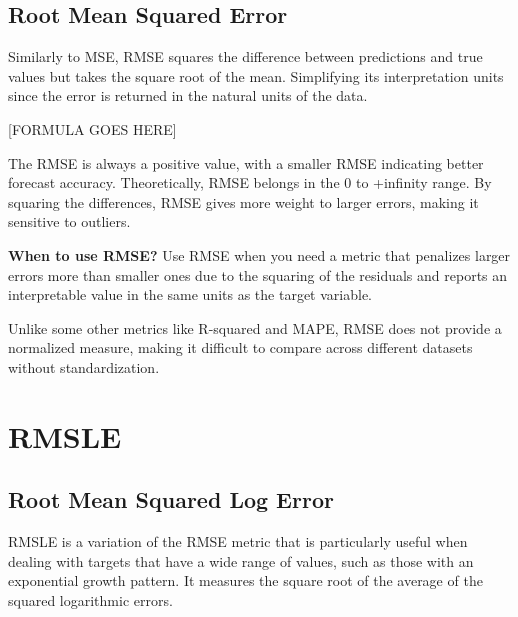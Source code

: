 \subsection{Root Mean Squared Error}

Similarly to MSE, RMSE squares the difference between predictions and true values but takes the square root of the mean.
Simplifying its interpretation units since the error is returned in the natural units of the data.

\begin{center}
    [FORMULA GOES HERE]
\end{center}

The RMSE is always a positive value, with a smaller RMSE indicating better forecast accuracy.
Theoretically, RMSE belongs in the 0 to +infinity range. By squaring the differences, RMSE gives more weight to larger errors, making it sensitive to outliers.

\textbf{When to use RMSE?}
Use RMSE when you need a metric that penalizes larger errors more than smaller ones due to the squaring of the residuals and reports an
interpretable value in the same units as the target variable.

{
    \item Unlike some other metrics like R-squared and MAPE, RMSE does not provide a normalized measure, making it difficult to compare across different datasets without standardization.
}

\clearpage
\thispagestyle{regressionstyle}
\section{RMSLE}
\subsection{Root Mean Squared Log Error}

RMSLE is a variation of the RMSE metric that is particularly useful when dealing with targets that have a wide range of values, such as those with an exponential growth pattern.
It measures the square root of the average of the squared logarithmic errors.

